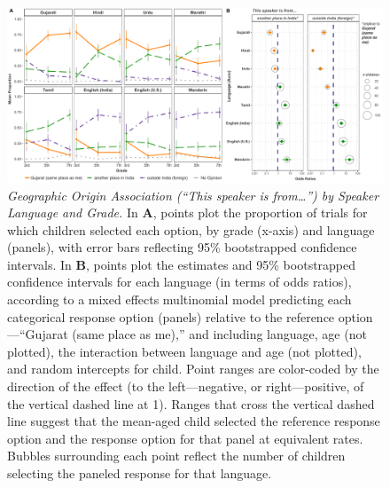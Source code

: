 \documentclass{foushee-adapted-preprint}
\begin{document}
\begin{figure}[h!]
    \centering
    \includegraphics[width=\linewidth]{figures/combined_plots/combined_geo_finalized.pdf}
    \caption{\textit{Geographic Origin Association (``This speaker is from\ldots'') by Speaker Language and Grade.} 
    In \textbf{A}, points plot the proportion of trials for which children selected each option, by grade (x-axis) and language (panels), with error bars reflecting 95\% bootstrapped confidence intervals. 
    In \textbf{B}, points plot the estimates and 95\% bootstrapped confidence intervals for each language (in terms of odds ratios), according to a mixed effects multinomial model predicting each categorical response option (panels) relative to the reference option---``Gujarat (same place as me),'' and including language, age (not plotted), the interaction between language and age (not plotted), and random intercepts for child. 
    Point ranges are color-coded by the direction of the effect (to the left---negative, or right---positive, of the vertical dashed line at 1). 
    Ranges that cross the vertical dashed line suggest that the mean-aged child selected the reference response option and the response option for that panel at equivalent rates. 
    Bubbles surrounding each point reflect the number of children selecting the paneled response for that language.}
    \label{fig:geographic-origin}
\end{figure}
\end{document}
